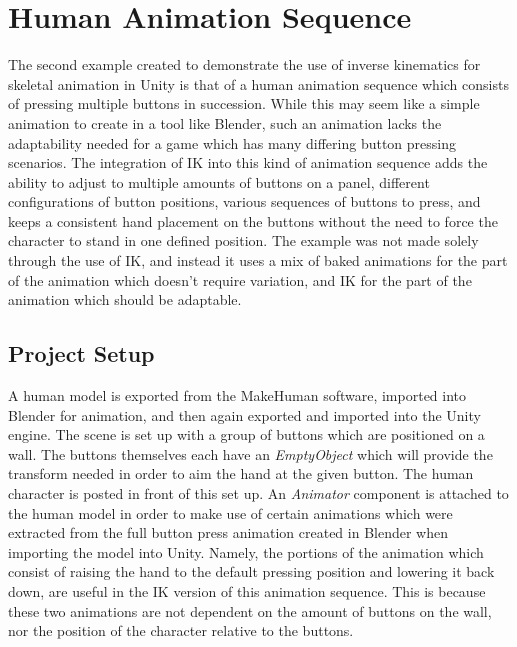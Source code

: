 \section{Human Animation Sequence}
The second example created to demonstrate the use of inverse kinematics for
skeletal animation in Unity is that of a human animation sequence which consists
of pressing multiple buttons in succession. While this may seem like a simple
animation to create in a tool like Blender, such an animation lacks the
adaptability needed for a game which has many differing button pressing
scenarios. The integration of IK into this kind of animation sequence adds the
ability to adjust to multiple amounts of buttons on a panel, different
configurations of button positions, various sequences of buttons to press, and
keeps a consistent hand placement on the buttons without the need to force the
character to stand in one defined position. The example was not made solely
through the use of IK, and instead it uses a mix of baked animations for the
part of the animation which doesn't require variation, and IK for the part of
the animation which should be adaptable.

\subsection{Project Setup}
A human model is exported from the MakeHuman software, imported into Blender for
animation, and then again exported and imported into the Unity engine. The scene
is set up with a group of buttons which are positioned on a wall. The buttons
themselves each have an \textit{EmptyObject} which will provide the transform
needed in order to aim the hand at the given button. The human character is
posted in front of this set up. An \textit{Animator} component is attached to
the human model in order to make use of certain animations which were extracted
from the full button press animation created in Blender when importing the model
into Unity. Namely, the portions of the animation which consist of raising the
hand to the default pressing position and lowering it back down, are useful in
the IK version of this animation sequence. This is because these two animations
are not dependent on the amount of buttons on the wall, nor the position of the
character relative to the buttons.
